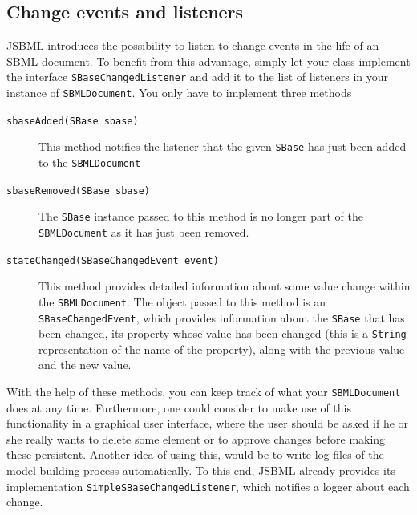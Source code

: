 \documentclass[
  BCOR12mm,
  letterpaper,
  11pt,
  headsepline,
  pointlessnumbers,
  tablecaptionabove,
  onelinecaption,
  headinclude,
  appendixprefix,
  idxtotoc,
  bibtotoc,
  twoside,
  titlepage
]{scrartcl}
\begin{document}
\subsection{Change events and listeners}

JSBML introduces the possibility to listen to change events in the life of an
SBML document. To benefit from this advantage, simply let your class implement
the interface \texttt{SBaseChangedListener} and add it to the list of listeners in
your instance of \texttt{SBMLDocument}. You only have to implement three methods
\begin{description}
 \item[\texttt{sbaseAdded(SBase sbase)}] This method notifies the listener that the given \texttt{SBase}
   has just been added to the \texttt{SBMLDocument}
 \item[\texttt{sbaseRemoved(SBase sbase)}] The \texttt{SBase} instance passed to this method is no
   longer part of the \texttt{SBMLDocument} as it has just been removed.
 \item[\texttt{stateChanged(SBaseChangedEvent event)}] This method provides detailed information about some value
   change within the \texttt{SBMLDocument}. The object passed to this method is
   an \texttt{SBaseChangedEvent}, which provides information about the \texttt{SBase}
   that has been changed, its property whose value has been changed (this is a
   \texttt{String} representation of the name of the property), along with the
   previous value and the new value.
\end{description}
With the help of these methods, you can keep track of what your
\texttt{SBMLDocument} does at any time. Furthermore, one could consider to make
use of this functionality in a graphical user interface, where the user should
be asked if he or she really wants to delete some element or to approve changes
before making these persistent. Another idea of using this, would be to write
log files of the model building process
automatically. To this end, JSBML already provides its implementation
\texttt{SimpleSBaseChangedListener},
 which notifies a logger about
each change.
\end{document}
